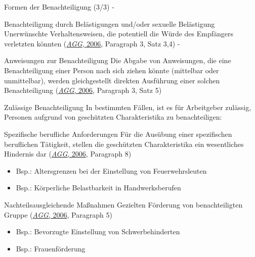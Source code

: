 \documentclass[
  10pt,
  ignorenonframetext,
]{beamer}
\providecommand{\tightlist}{%
  \setlength{\itemsep}{0pt}\setlength{\parskip}{0pt}}
\begin{document}
\begin{frame}{Formen der Benachteiligung (3/3) -}
\protect\hypertarget{formen-der-benachteiligung-33--}{}
\begin{block}{Benachteiligung durch Belästigungen und/oder sexuelle
Belästigung}
\protect\hypertarget{benachteiligung-durch-beluxe4stigungen-undoder-sexuelle-beluxe4stigung}{}
Unerwünschte Verhaltensweisen, die potentiell die Würde des Empfängers
verletzten könnten (\protect\hyperlink{ref-agg}{\emph{AGG}, 2006},
Paragraph 3, Satz 3,4) -
\end{block}

\begin{block}{Anweisungen zur Benachteiligung}
\protect\hypertarget{anweisungen-zur-benachteiligung}{}
Die Abgabe von Anweisungen, die eine Benachteiligung einer Person nach
sich ziehen könnte (mittelbar oder unmittelbar), werden gleichgestellt
direkten Ausführung einer solchen Benachteiligung
(\protect\hyperlink{ref-agg}{\emph{AGG}, 2006}, Paragraph 3, Satz 5)
\end{block}
\end{frame}

\begin{frame}{Zulässige Benachteiligung}
\protect\hypertarget{zuluxe4ssige-benachteiligung}{}
In bestimmten Fällen, ist es für Arbeitgeber zulässig, Personen aufgrund
von geschützten Charakteristika zu benachteiligen:

\begin{block}{Spezifische berufliche Anforderungen}
\protect\hypertarget{spezifische-berufliche-anforderungen}{}
Für die Ausübung einer spezifischen beruflichen Tätigkeit, stellen die
geschützten Charakteristika ein wesentliches Hindernis dar
(\protect\hyperlink{ref-agg}{\emph{AGG}, 2006}, Paragraph 8)

\begin{itemize}
\tightlist
\item
  Bsp.: Altersgrenzen bei der Einstellung von Feuerwehrsleuten
\item
  Bsp.: Körperliche Belastbarkeit in Handwerksberufen
\end{itemize}
\end{block}

\begin{block}{Nachteilsausgleichende Maßnahmen}
\protect\hypertarget{nachteilsausgleichende-mauxdfnahmen}{}
Gezielten Förderung von benachteiligten Gruppe
(\protect\hyperlink{ref-agg}{\emph{AGG}, 2006}, Paragraph 5)

\begin{itemize}
\tightlist
\item
  Bsp.: Bevorzugte Einstellung von Schwerbehinderten
\item
  Bsp.: Frauenförderung
\end{itemize}
\end{block}
\end{frame}
\end{document}
